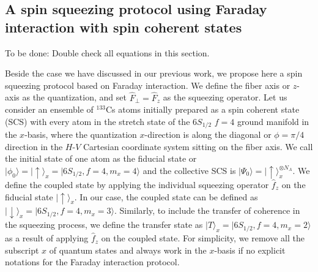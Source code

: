 \documentclass[preprint,aps,pra,onecolumn,superscriptaddress]{revtex4-1} %
\def\ket#1{\lvert{#1}\rangle}%
\newcommand{\comment}[1]{{\color{Maroon} #1}}
\begin{document}
\subsection{A spin squeezing protocol using Faraday interaction with spin coherent states}
\comment{To be done: Double check all equations in this section.}

Beside the case we have discussed in our previous work, we propose here a spin squeezing protocol based on Faraday interaction.
We define the fiber axis or $ z $-axis as the quantization, and set $ \hat{F}_\perp=\hat{F}_z $ as the squeezing operator. 
Let us consider an ensemble of $ ^{133} $Cs atoms initially prepared as a spin coherent state (SCS) with every atom in the stretch state of the $ 6S_{1/2}$ $f=4 $ ground manifold in the $ x $-basis, where the quantization $ x $-direction is along the diagonal or $ \phi=\pi/4 $ direction in the $ H $-$ V $ Cartesian coordinate system sitting on the fiber axis.
We call the initial state of one atom as the fiducial state or $ \ket{\phi_0}=\ket{\uparrow}_x = \ket{6S_{1/2},f=4,m_x=4} $ and the collective SCS is $ \ket{\Psi_0}=\ket{\uparrow}_x^{\otimes N_A} $.
We define the coupled state by applying the individual squeezing operator $ \hat{f}_z$ on the fiducial state $\ket{\uparrow}_x $.
In our case, the coupled state can be defined as $ \ket{\downarrow}_x=\ket{6S_{1/2},f=4,m_x=3} $.
Similarly, to include the transfer of coherence in the squeezing process, we define the transfer state as $ \ket{T}_x=\ket{6S_{1/2},f=4,m_x=2} $ as a result of applying $ \hat{f}_z$ on the coupled state. 
For simplicity, we remove all the subscript $ x $ of quantum states and always work in the $ x $-basis if no explicit notations for the Faraday interaction protocol. 
\end{document}

